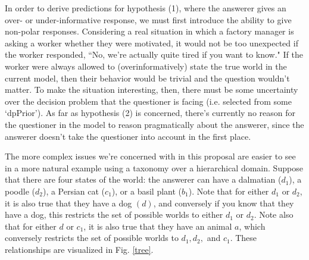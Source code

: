 \documentclass[12pt]{amsart}
\begin{document}
In order to derive predictions for hypothesis (1), where the answerer gives an over- or under-informative response, we must first introduce the ability to give non-polar responses. Considering a real situation in which a factory manager is asking a worker whether they were motivated, it would not be too unexpected if the worker responded, ``No, we're actually quite tired if you want to know." If the worker were always allowed to (overinformatively) state the true world in the current model, then their behavior would be trivial and the question wouldn't matter. To make the situation interesting, then, there must be some uncertainty over the decision problem that the questioner is facing (i.e. selected from some `dpPrior'). As far as hypothesis (2) is concerned, there's currently no reason for the questioner in the model to reason pragmatically about the answerer, since the answerer doesn't take the questioner into account in the first place.

The more complex issues we're concerned with in this proposal are easier to see in a more natural example using a taxonomy over a hierarchical domain. Suppose that there are four states of the world: the answerer can have a dalmatian ($d_1$), a poodle ($d_2$), a Persian cat ($c_1$), or a basil plant ($b_1$). Note that for either $d_1$ or $d_2$, it is also true that they have a dog $(d)$, and conversely if you know that they have a dog, this restricts the set of possible worlds to either $d_1$ or $d_2$. Note also that for either $d$ or $c_1$, it is also true that they have an animal $a$, which conversely restricts the set of possible worlds to $d_1, d_2,$ and $c_1$.  These relationships are visualized in Fig. \ref{tree}. 
\end{document}
